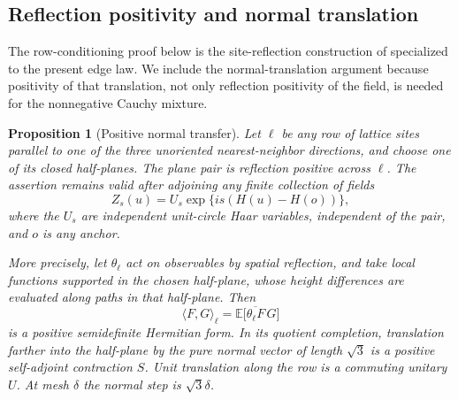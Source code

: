 \documentclass[11pt]{article}
\newcommand{\E}{\mathbb E}
\newtheorem{proposition}[theorem]{Proposition}
\theoremstyle{definition}
\theoremstyle{remark}
\numberwithin{equation}{section}
\begin{document}
\subsection{Reflection positivity and normal translation}

The row-conditioning proof below is the site-reflection construction
of \cite[Section~3, example~5]{FILS1978} specialized to the present edge law.
We include the normal-translation argument because positivity of that
translation, not only reflection positivity of the field, is needed
for the nonnegative Cauchy mixture.

\begin{proposition}[Positive normal transfer]
\label{prop:reflection-transfer}
Let $\ell$ be any row of lattice sites parallel to one of the three
unoriented nearest-neighbor directions, and choose one of its closed
half-planes.  The plane pair is reflection positive across $\ell$.
The assertion remains valid after adjoining any finite collection of fields
\begin{equation}
 \label{plane:eq:phases}
 Z_s(u)=U_s\exp\{is(H(u)-H(o))\},
\end{equation}
where the $U_s$ are independent unit-circle Haar variables, independent of
the pair, and $o$ is any anchor.

More precisely, let $\theta_\ell$ act on observables by spatial reflection,
and take local functions supported in the chosen half-plane, whose
height differences are evaluated along paths in that half-plane.  Then
\[
 \langle F,G\rangle_\ell
     =\E\big[\overline{\theta_\ell F}\,G\big]
\]
is a positive semidefinite Hermitian form.  In its quotient completion,
translation farther into the half-plane by the pure normal vector of
length $\sqrt3$ is a positive self-adjoint contraction $S$.  Unit
translation along the row is a commuting unitary $U$.  At mesh $\delta$
the normal step is $\sqrt3\delta$.
\end{proposition}
\end{document}
